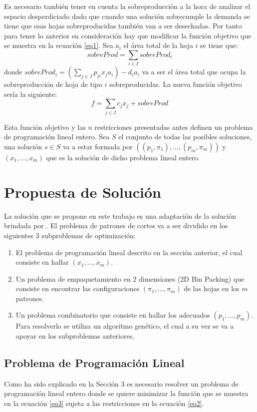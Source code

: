 \documentclass[a4paper,10pt,twocolumn]{article}
\begin{document}
Es necesario también tener en cuenta la sobreproducción a la hora de analizar el espacio desperdiciado dado que cuando una solución sobrecumple la demanda se tiene que esas hojas sobreproducidas también van a ser desechadas. Por tanto para tener lo anterior en consideración hay que modificar la función objetivo que se muestra en la ecuación \eqref{eq1}. Sea $a_i$ el área total de la hoja $i$ se tiene que:
 $$sobreProd = \sum_{i \in I} sobreProd_i $$ 
donde $sobreProd_i = (\sum_{j \in J} p_{ji}x_ja_i)  -  d_ia_i$ va a ser el área total que ocupa la sobreproducción de hoja de tipo $i$ sobreproducidas.
La nueva función objetivo sería la siguiente:
\begin{equation}
f = \sum_{j \in J}c_j x_j + sobreProd
\label{eq3}
\end{equation}

Esta función objetivo y las $n$ restricciones presentadas antes definen un problema de programación lineal entero. Sea $S$ el conjunto de todas las posibles soluciones, una solución $s \in S$ va a estar formada por $((p_1,\pi_1),...,(p_m,\pi_m))$ y $(x_1,...,x_m)$ que es la solución de dicho problema lineal entero.


\section{Propuesta de Solución}
La solución que se propone en este trabajo es una adaptación de la solución brindada por \cite{4}. El problema de patrones de cortes va a ser dividido en los siguientes 3 subproblemas de optimización:
\begin{enumerate}
	\item El problema de programación lineal descrito en la sección anterior, el cual consiste en hallar $(x_1,...,x_m)$.
	\item Un problema de empaquetamiento en 2 dimensiones (2D Bin Packing) que consiste en encontrar las configuraciones $(\pi_1,...,\pi_m)$ de las hojas en los $m$ patrones.
	\item Un problema combinatorio que consiste en hallar los adecuados $(p_1,...,p_m)$. Para resolverlo se utiliza un algoritmo genético, el cual a su vez se va a apoyar en los subproblemas anteriores. 
\end{enumerate}

\subsection{Problema de Programación Lineal}
Como ha sido explicado en la Sección 3 es necesario resolver un problema de programación lineal entero donde se quiere minimizar la función que se muestra en la ecuación \eqref{eq3} sujeta a las restricciones en la ecuación \eqref{eq2}.
\end{document}
